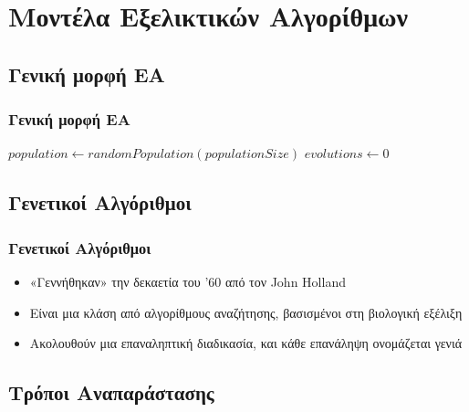 \documentclass[xetex,mathserif,serif,14pt]{beamer}
\begin{document}
\section{Μοντέλα Εξελικτικών Αλγορίθμων}

\subsection{Γενική μορφή ΕΑ}

\begin{frame}
\frametitle{Γενική μορφή ΕΑ}
\centering
\begin{algorithm}[H]
    $population \gets randomPopulation(populationSize)$\;
    $evolutions \gets 0$\;
    \;
\end{algorithm}
\end{frame}

\subsection{Γενετικοί Αλγόριθμοι}

\begin{frame}
\frametitle{Γενετικοί Αλγόριθμοι}
\begin{itemize}
  \item «Γεννήθηκαν» την δεκαετία του '60 από τον John Holland\pause
  \item Είναι μια κλάση από αλγορίθμους αναζήτησης, βασισμένοι στη βιολογική εξέλιξη\pause
  \item Ακολουθούν μια επαναληπτική διαδικασία, και κάθε επανάληψη ονομάζεται γενιά
\end{itemize}
\end{frame}

\subsection{Τρόποι Αναπαράστασης}
\end{document}
